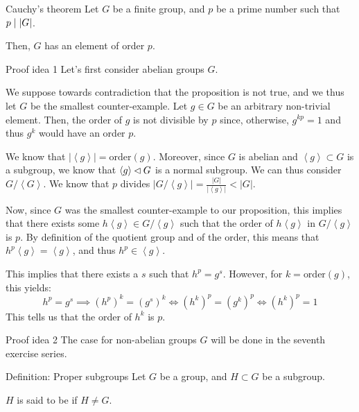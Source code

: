 \documentclass[a4paper]{article}
\begin{document}
\begin{parag}{Cauchy's theorem}
    Let $G$ be a finite group, and $p$ be a prime number such that $p \divides \left|G\right|$.

    Then, $G$ has an element of order $p$.

    \begin{subparag}{Proof idea 1}
        Let's first consider abelian groups $G$. 

        We suppose towards contradiction that the proposition is not true, and we thus let $G$ be the smallest counter-example. Let $g \in G$ be an arbitrary non-trivial element. Then, the order of $g$ is not divisible by $p$ since, otherwise, $g^{kp}= 1$ and thus $g^k$ would have an order $p$. 

        We know that $\left|\left\langle g \right\rangle\right| = \text{order}\left(g\right)$. Moreover, since $G$ is abelian and $\left\langle g \right\rangle \subset G$ is a subgroup, we know that $\left\langle g \right\rangle \normalsubgroup G$ is a normal subgroup. We can thus consider $G / \left\langle G \right\rangle$. We know that $p$ divides $\left|G / \left\langle g \right\rangle\right| = \frac{\left|G\right|}{\left|\left\langle g \right\rangle\right|} < \left|G\right|$.

        Now, since $G$ was the smallest counter-example to our proposition, this implies that there exists some $h\left\langle g \right\rangle \in G / \left\langle g \right\rangle$ such that the order of $h \left\langle g \right\rangle$ in $G / \left\langle g \right\rangle$ is $p$. By definition of the quotient group and of the order, this means that $h^p \left\langle g \right\rangle = \left\langle g \right\rangle$, and thus $h^p \in \left\langle g \right\rangle$. 

        This implies that there exists a $s$ such that $h^p = g^s$. However, for $k = \text{order}\left(g\right)$, this yields: 
        \[h^p = g^s \implies \left(h^p\right)^k = \left(g^s\right)^k \iff \left(h^k\right)^p = \left(g^k\right)^p \iff \left(h^k\right)^p = 1\]
        This tells us that the order of $h^k$ is $p$.
    \end{subparag}

    \begin{subparag}{Proof idea 2}
        The case for non-abelian groups $G$ will be done in the seventh exercise series.
    \end{subparag}
\end{parag}

\begin{parag}{Definition: Proper subgroups}
    Let $G$ be a group, and $H \subset G$ be a subgroup.

    $H$ is said to be  if $H \neq G$.
\end{parag}
\end{document}
